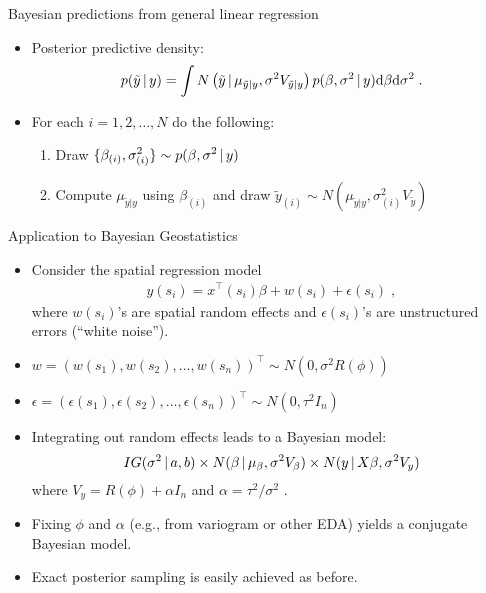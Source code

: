 \begin{frame}{Bayesian predictions from general linear regression}
\begin{itemize}
\item Posterior predictive density:
\[
 p(\tilde{y}\,|\, y) = \int N\left(\tilde{y}\,|\, \mu_{\tilde{y}|y}, \sigma^2 V_{\tilde{y}|y}\right) p(\beta, \sigma^2\,|\, y) \mbox{d}\beta \mbox{d}\sigma^2\; .
\]

\item For each $i=1,2,\ldots,N$ do the following: 
 \begin{enumerate}\setlength{\itemsep}{0.25cm}
  \item Draw $\displaystyle \{\beta_{(i)},\sigma^2_{(i)}\} \sim p(\beta,\sigma^2\,|\, y)$
  \item Compute $\mu_{\tilde{y}|y}$ using $\beta_{(i)}$ and draw $\displaystyle \tilde{y}_{(i)} \sim N(\mu_{\tilde{y}|y}, \sigma^2_{(i)} V_{\tilde{y}})$
 \end{enumerate}
 \end{itemize}

\end{frame}


\begin{frame}{Application to Bayesian Geostatistics}
 
 \begin{itemize}
  \item Consider the spatial regression model
  \begin{align*}
   y(s_i) = x^{\top}(s_i)\beta + w(s_i) + \epsilon(s_i)\; ,
  \end{align*}
  where $w(s_i)$'s are spatial random effects and $\epsilon(s_i)$'s are unstructured errors (``white noise'').
  
  \item $w = (w(s_1), w(s_2), \ldots, w(s_n))^{\top} \sim N(0, \sigma^2 R(\phi))$
  
  \item $\epsilon = (\epsilon(s_1), \epsilon(s_2), \ldots, \epsilon(s_n))^{\top} \sim N(0, \tau^2 I_n)$
  
  \item Integrating out random effects leads to a Bayesian model:
  \[
    IG(\sigma^2\,|\, a, b) \times N(\beta \,|\, \mu_{\beta}, \sigma^2V_{\beta}) \times N(y\,|\, X\beta, \sigma^2 V_y)
  \]
  where $V_{y} = R(\phi) + \alpha I_n$ and $\alpha = \tau^2/\sigma^2$\; .
  
  \item Fixing $\phi$ and $\alpha$ (e.g., from variogram or other EDA) yields a conjugate Bayesian model.
  
  \item Exact posterior sampling is easily achieved as before.
 \end{itemize}

\end{frame}

